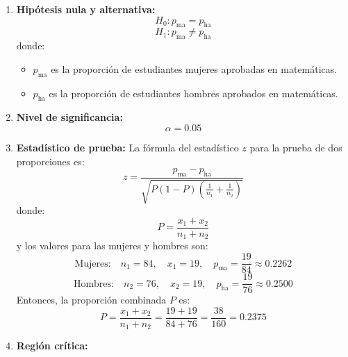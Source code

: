 \documentclass[
]{article}
\begin{document}
\begin{enumerate}
  \item \textbf{Hipótesis nula y alternativa:}
    \[
    H_0: p_{\text{ma}} = p_{\text{ha}}
    \]
    \[
    H_1: p_{\text{ma}} \neq p_{\text{ha}}
    \]
    donde:
    \begin{itemize}
        \item \( p_{\text{ma}} \) es la proporción de estudiantes mujeres aprobadas en matemáticas.
        \item \( p_{\text{ha}} \) es la proporción de estudiantes hombres aprobados en matemáticas.
    \end{itemize}
    
  \item \textbf{Nivel de significancia:}
    \[
    \alpha = 0.05
    \]
    
  \item \textbf{Estadístico de prueba:}
    La fórmula del estadístico \(z\) para la prueba de dos proporciones es:
    \[
    z = \frac{p_{\text{ma}} - p_{\text{ha}}}{\sqrt{P(1 - P) \left( \frac{1}{n_1} + \frac{1}{n_2} \right)}}
    \]
    donde:
    \[
    P = \frac{x_1 + x_2}{n_1 + n_2}
    \]
    y los valores para las mujeres y hombres son:
    \[
    \text{Mujeres:} \quad n_1 = 84, \quad x_1 = 19, \quad p_{\text{ma}} = \frac{19}{84} \approx 0.2262
    \]
    \[
    \text{Hombres:} \quad n_2 = 76, \quad x_2 = 19, \quad p_{\text{ha}} = \frac{19}{76} \approx 0.2500
    \]
    Entonces, la proporción combinada \(P\) es:
    \[
    P = \frac{x_1 + x_2}{n_1 + n_2} = \frac{19 + 19}{84 + 76} = \frac{38}{160} = 0.2375
    \]

  \item \textbf{Región crítica:}
    \begin{figure}[ht]
        \centering
\end{figure}
\end{enumerate}
\end{document}

